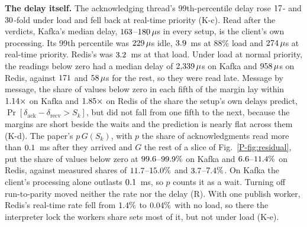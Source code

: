 \documentclass[10pt,journal,onecolumn]{IEEEtran}
\newcommand{\kafka}{Kafka}
\newcommand{\redis}{Redis}
\begin{document}
\textbf{The delay itself.} The acknowledging thread's 99th-percentile delay rose
$17$- and $30$-fold under load and fell back at real-time priority
(K-c). Read after the verdicts, \kafka{}'s median delay, $163$--$180\,\mu$s in
every setup, is the client's own processing. Its 99th percentile was $229\,\mu$s idle,
$3.9$~ms at $88\%$ load and $274\,\mu$s at real-time priority.
\redis{}'s was $3.2$~ms at that load. Under load
at normal priority, the readings below zero had a median delay of $2{,}339\,\mu$s on
\kafka{} and $958\,\mu$s on \redis{}, against $171$ and
$58\,\mu$s for the rest, so they were read late. Message by message, the share of
values below zero in each fifth of the margin lay within $1.14\times$ on \kafka{} and
$1.85\times$ on \redis{} of the share the setup's own delays predict,
$\Pr[\delta_{\mathrm{ack}} - \delta_{\mathrm{recv}} > S_k]$, but did not fall from one fifth to the
next, because the margins are short beside the waits and the prediction is nearly flat across
them (K-d). The paper's $p\,G(S_k)$, with $p$ the share of acknowledgments read more than
$0.1$~ms after they arrived and $G$ the rest of a slice of Fig.~\ref{P-fig:residual}, put
the share of values below zero at $99.6$--$99.9\%$ on \kafka{} and
$6.6$--$11.4\%$ on \redis{}, against measured shares of
$11.7$--$15.0\%$ and $3.7$--$7.4\%$. On \kafka{}
the client's processing alone outlasts $0.1$~ms, so $p$ counts it as a wait. Turning off
run-to-parity moved neither the rate nor the delay (R). With one publish worker, \redis{}'s real-time
rate fell from $1.4\%$ to $0.04\%$ with no load, so there the
interpreter lock the workers share sets most of it, but not under load (K-e).
\end{document}
